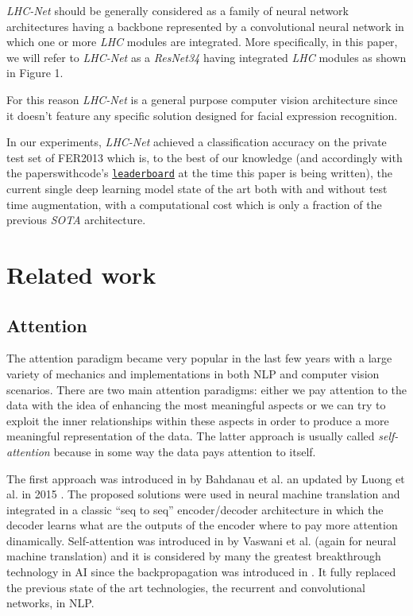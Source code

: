 \documentclass[fleqn,10pt]{SelfArx}
\begin{document}
\textit{LHC-Net} should be generally considered as a family of neural network architectures having a backbone represented by a convolutional neural network in which one or more \textit{LHC} modules are integrated. More specifically, in this paper, we will refer to \textit{LHC-Net} as a \textit{ResNet34} \cite{resnet} having integrated  \textit{LHC} modules as shown in Figure 1.

For this reason \textit{LHC-Net} is a general purpose computer vision architecture since it doesn't feature any specific solution designed for facial expression recognition. 

In our experiments, \textit{LHC-Net} achieved a classification accuracy on the private test set of FER2013 which is, to the best of our knowledge (and accordingly with the paperswithcode's \href{https://paperswithcode.com/sota/facial-expression-recognition-on-fer2013}{\texttt{leaderboard}} at the time this paper is being written), the current single deep learning model state of the art both with and without test time augmentation, with a computational cost which is only a fraction of the previous \textit{SOTA} architecture.\textit{}



\section{Related work}
\subsection{Attention}
The attention paradigm became very popular in the last few years with a large variety of mechanics and implementations in both NLP and computer vision scenarios. There are two main attention paradigms: either we pay attention to the data with the idea of enhancing the most meaningful aspects or we can try to exploit the inner relationships within these aspects in order to produce a more meaningful representation of the data. The latter approach is usually called \textit{self-attention} because in some way the data pays attention to itself. 

The first approach was introduced in  by Bahdanau et al. \cite{bahdanau2014neural} an updated by Luong et al. in 2015 \cite{luong2015effective}. The proposed solutions were used in neural machine translation and integrated in a classic ``seq to seq'' encoder/decoder architecture in which the decoder learns what are the outputs of the encoder where to pay more attention dinamically. 
Self-attention was introduced in  by Vaswani et al. \cite{Transformer} (again for neural machine translation) and it is considered by many the greatest breakthrough technology in AI since the backpropagation was introduced in  \cite{rumelhart1986learning}. It fully replaced the previous state of the art technologies, the recurrent and convolutional networks, in NLP.
\end{document}
